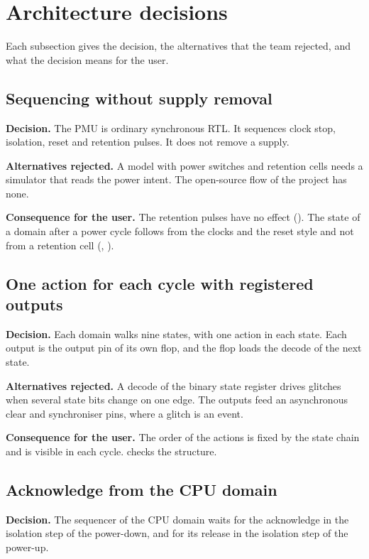 \section{Architecture decisions}\label{ds:ch:mod-power-management:decisions}
Each subsection gives the decision, the alternatives that the team rejected, and what the decision means for the user.

\subsection{Sequencing without supply removal}\label{ds:ch:mod-power-management:dec-model}
\textbf{Decision.} The PMU is ordinary synchronous RTL. It sequences clock stop, isolation, reset and retention pulses. It does not remove a supply.

\textbf{Alternatives rejected.} A model with power switches and retention cells needs a simulator that reads the power intent. The open-source flow of the project has none.

\textbf{Consequence for the user.} The retention pulses have no effect (). The state of a domain after a power cycle follows from the clocks and the reset style and not from a retention cell (, ).

\subsection{One action for each cycle with registered outputs}\label{ds:ch:mod-power-management:dec-fsm}
\textbf{Decision.} Each domain walks nine states, with one action in each state. Each output is the output pin of its own flop, and the flop loads the decode of the next state.

\textbf{Alternatives rejected.} A decode of the binary state register drives glitches when several state bits change on one edge. The outputs feed an asynchronous clear and synchroniser pins, where a glitch is an event.

\textbf{Consequence for the user.} The order of the actions is fixed by the state chain and is visible in each cycle.  checks the structure.

\subsection{Acknowledge from the CPU domain}\label{ds:ch:mod-power-management:dec-ack}
\textbf{Decision.} The sequencer of the CPU domain waits for the acknowledge in the isolation step of the power-down, and for its release in the isolation step of the power-up.


